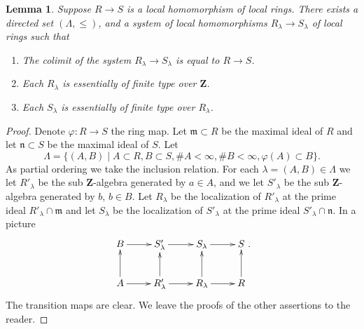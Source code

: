\documentclass[10pt,a4paper]{amsart}
\theoremstyle{plain}
\newtheorem{lemma}[subsection]{Lemma}
\theoremstyle{definition}
\theoremstyle{remark}
\numberwithin{equation}{subsection}
\begin{document}
\begin{lemma}
\label{lemma-limit-no-condition-local}
Suppose $R \to S$ is a local homomorphism of local rings.
There exists a directed set $(\Lambda, \leq)$, and
a system of local homomorphisms $R_\lambda \to S_\lambda$
of local rings such that
\begin{enumerate}
\item The colimit of the system $R_\lambda \to S_\lambda$
is equal to $R \to S$.
\item Each $R_\lambda$ is essentially of finite type
over $\mathbf{Z}$.
\item Each $S_\lambda$ is essentially of finite type
over $R_\lambda$.
\end{enumerate}
\end{lemma}

\begin{proof}
Denote $\varphi : R  \to S$ the ring map.
Let $\mathfrak m \subset R$ be the maximal ideal
of $R$ and let $\mathfrak n \subset S$ be the maximal
ideal of $S$. Let
$$
\Lambda = \{
(A, B)
\mid
A \subset R, B \subset S, \# A < \infty, \# B < \infty, \varphi(A) \subset B
\}.
$$
As partial ordering we take the inclusion relation. For each
$\lambda = (A, B) \in \Lambda$ we let $R'_\lambda$ be
the sub $\mathbf{Z}$-algebra generated by
$a \in A$, and we let $S'_\lambda$ be the sub
$\mathbf{Z}$-algebra generated by $b$, $b \in B$.
Let $R_\lambda$ be the localization of $R'_\lambda$
at the prime ideal $R'_\lambda \cap \mathfrak m$ and let
$S_\lambda$ be the localization of $S'_\lambda$ at
the prime ideal $S'_\lambda \cap \mathfrak n$.
In a picture
$$
\xymatrix{
B \ar[r] &
S'_\lambda \ar[r] &
S_\lambda \ar[r] &
S \\
A \ar[r] \ar[u] &
R'_\lambda \ar[r] \ar[u] &
R_\lambda \ar[r] \ar[u] &
R \ar[u]
}.
$$
The transition maps are clear. We leave the proofs of the other
assertions to the reader.
\end{proof}
\end{document}
